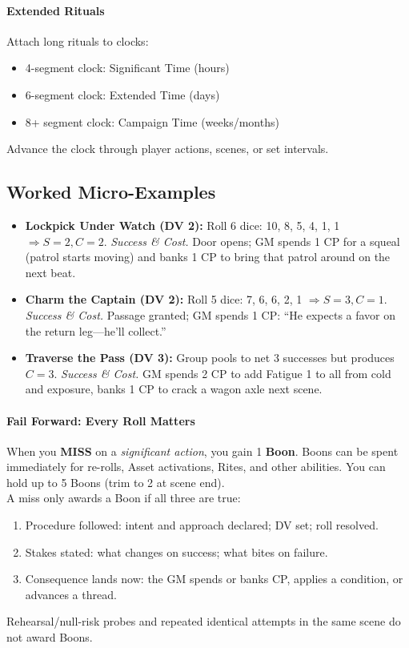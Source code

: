 \paragraph{Extended Rituals}
Attach long rituals to clocks:
\begin{itemize}
  \item 4-segment clock: Significant Time (hours)
  \item 6-segment clock: Extended Time (days)
  \item 8+ segment clock: Campaign Time (weeks/months)
\end{itemize}
Advance the clock through player actions, scenes, or set intervals.

\subsection{Worked Micro-Examples}
\begin{itemize}
  \item \textbf{Lockpick Under Watch (DV 2):} Roll 6 dice: 10, 8, 5, 4, 1, 1 $\Rightarrow S=2, C=2$. \emph{Success \& Cost.} Door opens; GM spends 1 CP for a squeal (patrol starts moving) and banks 1 CP to bring that patrol around on the next beat.
  \item \textbf{Charm the Captain (DV 2):} Roll 5 dice: 7, 6, 6, 2, 1 $\Rightarrow S=3, C=1$. \emph{Success \& Cost.} Passage granted; GM spends 1 CP: ``He expects a favor on the return leg—he'll collect.''
  \item \textbf{Traverse the Pass (DV 3):} Group pools to net 3 successes but produces $C=3$. \emph{Success \& Cost.} GM spends 2 CP to add Fatigue 1 to all from cold and exposure, banks 1 CP to crack a wagon axle next scene.
\end{itemize}

\paragraph{Fail Forward: Every Roll Matters}
When you \textbf{MISS} on a \emph{significant action}, you gain 1 \textbf{Boon}. Boons can be spent immediately for re-rolls, Asset activations, Rites, and other abilities. You can hold up to 5 Boons (trim to 2 at scene end).\\
A miss only awards a Boon if all three are true:
\begin{enumerate}
  \item Procedure followed: intent and approach declared; DV set; roll resolved.
  \item Stakes stated: what changes on success; what bites on failure.
  \item Consequence lands now: the GM spends or banks CP, applies a condition, or advances a thread.
\end{enumerate}
Rehearsal/null-risk probes and repeated identical attempts in the same scene do not award Boons.
